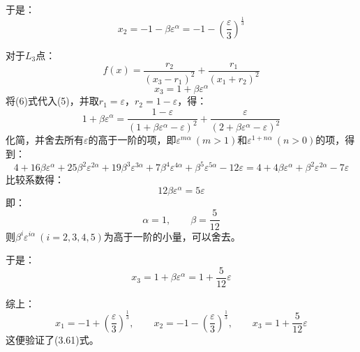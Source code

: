 \documentclass[a4paper,fontset=windows]{ctexart}
\begin{document}
\begin{itemize}
        于是：
        \[
        x_2 = -1 - \beta\varepsilon^\alpha = -1 - \left(\frac{\varepsilon}{3}\right)^{\tfrac{1}{3}}
        \]
        \medskip

        对于$L_3$点：
        \[
        f(x) = \frac{r_2}{(x_3-r_1)^2} + \frac{r_1}{(x_1+r_2)^2} \tag{5}
        \]
        \[
        x_3 = 1 + \beta\varepsilon^\alpha \tag{6}
        \]
        将(6)式代入(5)，并取$r_1=\varepsilon$，$r_2=1-\varepsilon$，得：
        \[
        1 + \beta\varepsilon^\alpha = \frac{1-\varepsilon}{(1+\beta\varepsilon^\alpha-\varepsilon)^2} + \frac{\varepsilon}{\left(2+\beta\varepsilon^\alpha-\varepsilon\right)^2}
        \]
        化简，并舍去所有$\varepsilon$的高于一阶的项，即$\varepsilon^{m\alpha}\ (m>1)$和$\varepsilon^{1+n\alpha}\ (n>0)$的项，得到：
        \[
        4 + 16\beta\varepsilon^\alpha + 25\beta^2\varepsilon^{2\alpha} + 19\beta^3\varepsilon^{3\alpha} + 7\beta^4\varepsilon^{4\alpha} + \beta^5\varepsilon^{5\alpha} - 12\varepsilon = 4 + 4\beta\varepsilon^\alpha + \beta^2\varepsilon^{2\alpha} -7\varepsilon
        \]
        比较系数得：
        \[
        12\beta\varepsilon^\alpha = 5\varepsilon
        \]
        即：
        \[
        \alpha = 1,\qquad \beta = \frac{5}{12}
        \]
        则$\beta^i\varepsilon^{i\alpha}\ (i=2,3,4,5)$为高于一阶的小量，可以舍去。

        于是：
        \[
        x_3 = 1 + \beta\varepsilon^\alpha = 1 + \frac{5}{12}\varepsilon
        \]
        \medskip

        综上：
        \[
        x_1 = -1 + \left(\frac{\varepsilon}{3}\right)^{\tfrac{1}{3}},\qquad
        x_2 = -1 - \left(\frac{\varepsilon}{3}\right)^{\tfrac{1}{3}},\qquad
        x_3 = 1 + \frac{5}{12}\varepsilon
        \]
        这便验证了(3.61)式。
        \bigskip


\end{itemize}
\end{document}
